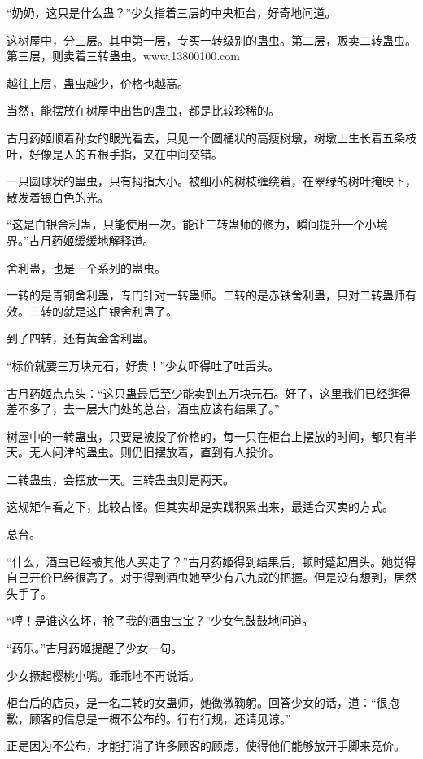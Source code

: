 
\begin{this_body}

“奶奶，这只是什么蛊？”少女指着三层的中央柜台，好奇地问道。

这树屋中，分三层。其中第一层，专买一转级别的蛊虫。第二层，贩卖二转蛊虫。第三层，则卖着三转蛊虫。www.13800100.com

越往上层，蛊虫越少，价格也越高。

当然，能摆放在树屋中出售的蛊虫，都是比较珍稀的。

古月药姬顺着孙女的眼光看去，只见一个圆桶状的高瘦树墩，树墩上生长着五条枝叶，好像是人的五根手指，又在中间交错。

一只圆球状的蛊虫，只有拇指大小。被细小的树枝缠绕着，在翠绿的树叶掩映下，散发着银白色的光。

“这是白银舍利蛊，只能使用一次。能让三转蛊师的修为，瞬间提升一个小境界。”古月药姬缓缓地解释道。

舍利蛊，也是一个系列的蛊虫。

一转的是青铜舍利蛊，专门针对一转蛊师。二转的是赤铁舍利蛊，只对二转蛊师有效。三转的就是这白银舍利蛊了。

到了四转，还有黄金舍利蛊。

“标价就要三万块元石，好贵！”少女吓得吐了吐舌头。

古月药姬点点头：“这只蛊最后至少能卖到五万块元石。好了，这里我们已经逛得差不多了，去一层大门处的总台，酒虫应该有结果了。”

树屋中的一转蛊虫，只要是被投了价格的，每一只在柜台上摆放的时间，都只有半天。无人问津的蛊虫。则仍旧摆放着，直到有人投价。

二转蛊虫，会摆放一天。三转蛊虫则是两天。

这规矩乍看之下，比较古怪。但其实却是实践积累出来，最适合买卖的方式。

总台。

“什么，酒虫已经被其他人买走了？”古月药姬得到结果后，顿时蹙起眉头。她觉得自己开价已经很高了。对于得到酒虫她至少有八九成的把握。但是没有想到，居然失手了。

“哼！是谁这么坏，抢了我的酒虫宝宝？”少女气鼓鼓地问道。

“药乐。”古月药姬提醒了少女一句。

少女撅起樱桃小嘴。乖乖地不再说话。

柜台后的店员，是一名二转的女蛊师，她微微鞠躬。回答少女的话，道：“很抱歉，顾客的信息是一概不公布的。行有行规，还请见谅。”

正是因为不公布，才能打消了许多顾客的顾虑，使得他们能够放开手脚来竞价。


\end{this_body}
